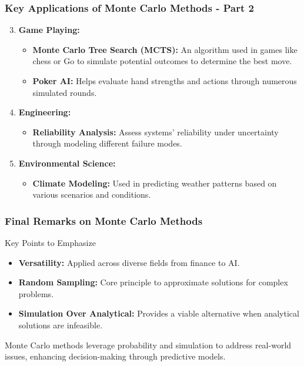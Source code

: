 \documentclass[aspectratio=169]{beamer}
\begin{document}
\begin{frame}[fragile]
    \frametitle{Key Applications of Monte Carlo Methods - Part 2}
    \begin{enumerate}
        \setcounter{enumi}{2} %
        \item \textbf{Game Playing:}
            \begin{itemize}
                \item \textbf{Monte Carlo Tree Search (MCTS):}
                    An algorithm used in games like chess or Go to simulate potential outcomes to determine the best move.
                \item \textbf{Poker AI:}
                    Helps evaluate hand strengths and actions through numerous simulated rounds.
            \end{itemize} 
        \item \textbf{Engineering:}
            \begin{itemize}
                \item \textbf{Reliability Analysis:}
                    Assess systems' reliability under uncertainty through modeling different failure modes.
            \end{itemize} 
        \item \textbf{Environmental Science:}
            \begin{itemize}
                \item \textbf{Climate Modeling:}
                    Used in predicting weather patterns based on various scenarios and conditions.
            \end{itemize}
    \end{enumerate}
\end{frame}

\begin{frame}[fragile]
    \frametitle{Final Remarks on Monte Carlo Methods}
    \begin{block}{Key Points to Emphasize}
        \begin{itemize}
            \item \textbf{Versatility:} Applied across diverse fields from finance to AI.
            \item \textbf{Random Sampling:} Core principle to approximate solutions for complex problems.
            \item \textbf{Simulation Over Analytical:} Provides a viable alternative when analytical solutions are infeasible.
        \end{itemize}
    \end{block}
    
    Monte Carlo methods leverage probability and simulation to address real-world issues, enhancing decision-making through predictive models.
\end{frame}
\end{document}
